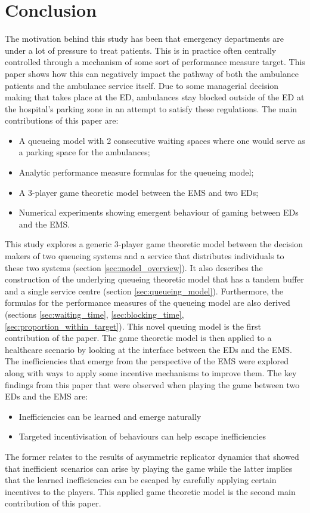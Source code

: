 \section{Conclusion}

The motivation behind this study has been that emergency departments are
under a lot of pressure to treat patients.
This is in practice often centrally controlled through a mechanism of some sort
of performance measure target.
This paper shows how this can negatively impact the pathway of both the
ambulance patients and the ambulance service itself.
Due to some managerial decision making that takes place at the ED, ambulances
stay blocked outside of the ED at the hospital's parking zone in an attempt
to satisfy these regulations.
The main contributions of this paper are:
\begin{itemize}
    \item A queueing model with 2 consecutive waiting spaces where one would
    serve as a parking space for the ambulances;
    \item Analytic performance measure formulas for the queueing model;
    \item A 3-player game theoretic model between the EMS and two EDs;
    \item Numerical experiments showing emergent behaviour of gaming between
    EDs and the EMS.
\end{itemize}

This study explores a generic 3-player game theoretic model between the
decision makers of two queueing systems and a service that distributes
individuals to these two systems (section \ref{sec:model_overview}).
It also describes the construction of the underlying queueing theoretic model
that has a tandem buffer and a single service centre (section
\ref{sec:queueing_model}).
Furthermore, the formulas for the performance measures of the queueing model
are also derived (sections \ref{sec:waiting_time}, \ref{sec:blocking_time},
\ref{sec:proportion_within_target}).
This novel queuing model is the first contribution of the paper.
The game theoretic model is then applied to a healthcare scenario by looking at
the interface between the EDs and the EMS.
The inefficiencies that emerge from the perspective of the EMS were explored
along with ways to apply some incentive mechanisms to improve them.
The key findings from this paper that were observed when playing the game
between two EDs and the EMS are:
\begin{itemize}
    \item Inefficiencies can be learned and emerge naturally
    \item Targeted incentivisation of behaviours can help escape inefficiencies
\end{itemize}
The former relates to the results of asymmetric replicator dynamics that showed
that inefficient scenarios can arise by playing the game while the latter
implies that the learned inefficiencies can be escaped by carefully applying
certain incentives to the players.
This applied game theoretic model is the second main contribution of this paper.

